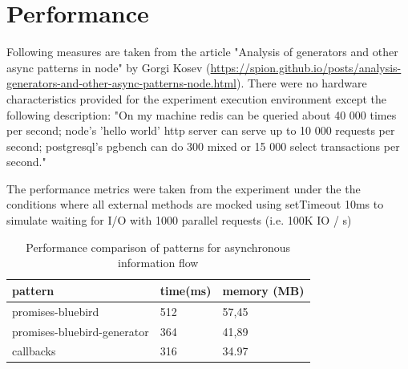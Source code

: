 





\section{Performance}
\label{subsec:performance}
Following measures are taken from the article "Analysis of generators and other async patterns in node" by Gorgi Kosev (\url{https://spion.github.io/posts/analysis-generators-and-other-async-patterns-node.html}). There were no hardware characteristics provided for the experiment execution environment except the following description\cite{asyncPerformance_2}: "On my machine redis can be queried about 40 000 times per second; node's 'hello world' http server can serve up to 10 000 requests per second; postgresql's pgbench can do 300 mixed or 15 000 select transactions per second." 

 The performance metrics were taken from the experiment under the the conditions where all external methods are mocked using setTimeout 10ms to simulate waiting for I/O with 1000 parallel requests (i.e. 100K IO / s) \cite{asyncPerformance_2}

\begin{table}[h]
	\begin{center}
		\begin{tabular}{| l | l | l | }
			\hline
			\textbf{pattern} & \textbf{time(ms)} & \textbf{memory (MB)} \\
			\hline
			promises-bluebird & 512 & 57,45 \\
			\hline
			promises-bluebird-generator & 364 & 41,89 \\
			\hline
			callbacks & 316 & 34.97 \\
			\hline
		\end{tabular}
	\end{center}
	\caption{Performance comparison of patterns for asynchronous information flow \cite{asyncPerformance_2}\cite{asyncPerformance}}
\end{table}


